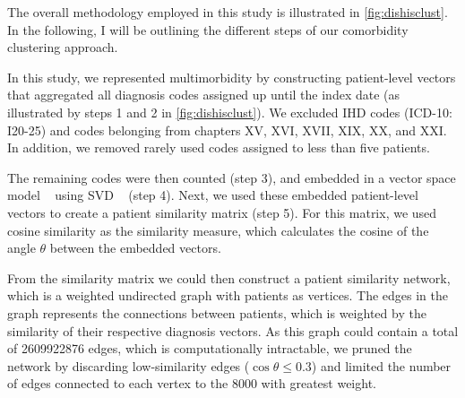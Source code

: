 The overall methodology employed in this study is illustrated 
in \cref{fig:dishisclust}. In the following, I will be outlining the 
different steps of our comorbidity clustering approach. 

In this study, we represented multimorbidity by constructing patient-level
vectors that aggregated all diagnosis codes assigned up until the index date 
(as illustrated by steps 1 and 2 in \cref{fig:dishisclust}).
We excluded \ac{IHD} codes (\ac{ICD-10}: I20-25) and
codes belonging from chapters XV, XVI, XVII, XIX, XX, and XXI.%
In addition, we removed rarely used codes assigned to less than five patients.

The remaining codes were then counted (step 3), 
and embedded in a vector space model 
~\autocite{saltonVector1975}
using \ac{SVD}
~\autocite{golubSingular1971} (step 4).
Next, we used these embedded patient-level vectors 
to create a patient similarity matrix (step 5). 
For this matrix, we used cosine similarity as the similarity measure,
which calculates the cosine of the angle \(\theta\) 
between the embedded vectors.

From the similarity matrix we could then 
construct a patient similarity network,
which is a weighted undirected graph with 
patients as vertices. 
The edges in the graph represents the connections between patients,
which is weighted by the similarity of their respective diagnosis vectors.
As this graph could contain a total of
\num{2609922876} edges, which is computationally intractable, 
we pruned the network by discarding low-similarity edges 
(\(\cos{\theta} \leq 0.3\)) and limited the number of edges
connected to each vertex to the \num{8000} with greatest weight.

